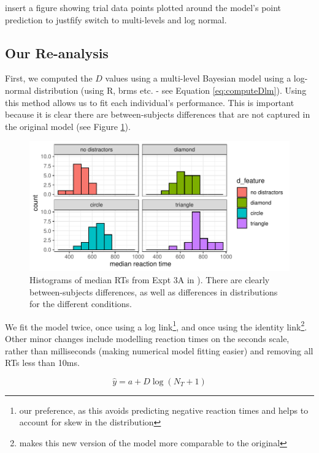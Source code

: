\documentclass[smallextended]{svjour3}       %
\begin{document}
insert  a figure showing trial data points plotted around the model's point prediction to justfify switch to multi-levels and log normal. 


\subsection{Our Re-analysis}

First, we computed the $D$ values using a multi-level Bayesian model using a log-normal distribution (using R, brms etc. - see Equation \ref{eq:computeDlm}). Using this method allows us to fit each individual's performance. This is important because it is clear there are between-subjects differences that are not captured in the original model (see Figure \ref{fig:buetti2019_hist}). 

\begin{figure}
\centering
\includegraphics[width=\textwidth]{../plots/histograms_of_rt.pdf}
\caption{Histograms of median RTs from Expt 3A in \cite{buetti2019predicting}). There are clearly between-subjects differences, as well as differences in distributions for the different conditions.}
\label{fig:buetti2019_hist}
\end{figure}

We fit the model twice, once using a log link\footnote{our preference, as this avoids predicting negative reaction times and helps to account for skew in the distribution}, and once using the identity link\footnote{makes this new version of the model more comparable to the original}. Other minor changes include modelling reaction times on the seconds scale, rather than milliseconds (making numerical model fitting easier) and removing all RTs less than 10ms.

\begin{equation}
\hat{y} = a + D\log(N_T + 1)
\label{eq:computeDlm}
\end{equation}
\end{document}
